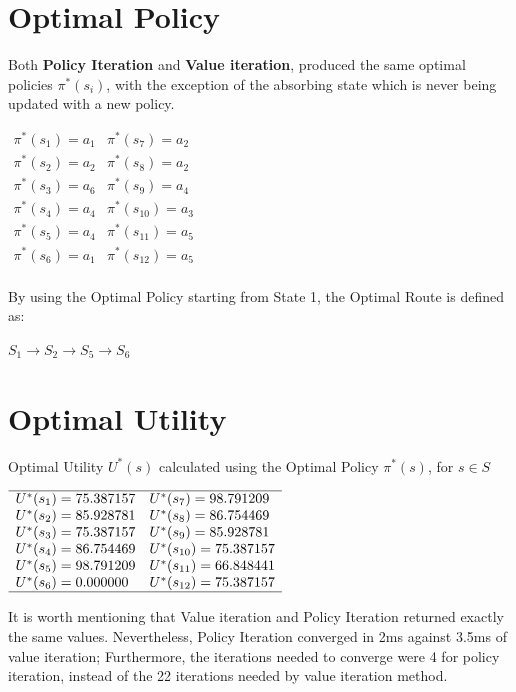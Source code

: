 \documentclass[11pt]{article}
\numberwithin{equation}{section}
\numberwithin{table}{section}
\numberwithin{figure}{secation}
\begin{document}
{		\section{Optimal Policy}
		Both \textbf{Policy Iteration} and \textbf{Value iteration}, produced the same optimal policies $\pi^{*}(s_{i})$, with the exception of the absorbing state which is never being updated with a new policy.
		
        $\begin{array}{cc}
        \pi^{*}(s_{1}) = a_{1} & \pi^{*}(s_{7}) = a_{2} \\
        \pi^{*}(s_{2}) = a_{2} & \pi^{*}(s_{8}) = a_{2} \\
        \pi^{*}(s_{3}) = a_{6} & \pi^{*}(s_{9}) = a_{4} \\
        \pi^{*}(s_{4}) = a_{4} & \pi^{*}(s_{10}) = a_{3} \\
        \pi^{*}(s_{5}) = a_{4} & \pi^{*}(s_{11}) = a_{5} \\
        \pi^{*}(s_{6}) = a_{1} & \pi^{*}(s_{12}) = a_{5} \\
        \end{array}$
		
		By using the Optimal Policy starting from State 1, the Optimal Route is defined as:
		
		$S_{1} \rightarrow S_{2} \rightarrow S_{5} \rightarrow S_{6}$
        \section{Optimal Utility}
		Optimal Utility $U^{*}(s)$ calculated using the Optimal Policy $\pi^{*}(s)$, for $ s \in S$
		
		$\begin{array}{ll}\hline
        U^{*}(s_{1}) = 75.387157 & U^{*}(s_{7}) = 98.791209 \\
        U^{*}(s_{2}) = 85.928781 & U^{*}(s_{8}) = 86.754469 \\
        U^{*}(s_{3}) = 75.387157 & U^{*}(s_{9}) = 85.928781 \\
        U^{*}(s_{4}) = 86.754469 & U^{*}(s_{10}) = 75.387157 \\
        U^{*}(s_{5}) = 98.791209 & U^{*}(s_{11}) = 66.848441 \\
        U^{*}(s_{6}) = 0.000000 & U^{*}(s_{12}) = 75.387157 \\ \hline
        \end{array}$
        
         It is worth mentioning that Value iteration and Policy Iteration returned exactly the same values. Nevertheless, Policy Iteration converged in 2ms against 3.5ms of value iteration; Furthermore, the iterations needed to converge were 4 for policy iteration, instead of the 22 iterations needed by value iteration method.
}
\end{document}
